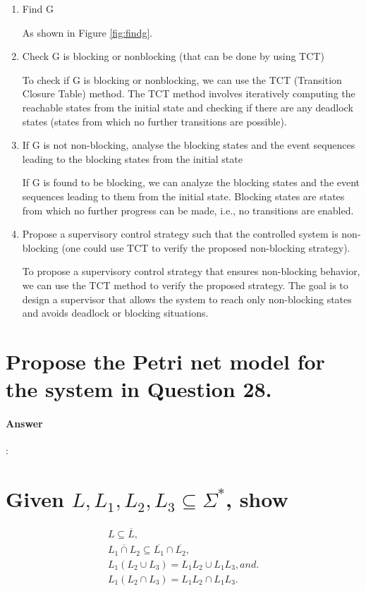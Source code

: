 \documentclass{article}
\begin{document}
\begin{enumerate}
  \item Find G 
  
  As shown in Figure \ref{fig:findg}.
  \item Check G is blocking or nonblocking (that can be done by using TCT)
  
  To check if G is blocking or nonblocking, we can use the TCT (Transition Closure Table) method. The TCT method involves iteratively computing the reachable states from the initial state and checking if there are any deadlock states (states from which no further transitions are possible).
  \item If G is not non-blocking, analyse the blocking states and the event sequences leading to the blocking states from the initial state
  
  If G is found to be blocking, we can analyze the blocking states and the event sequences leading to them from the initial state. Blocking states are states from which no further progress can be made, i.e., no transitions are enabled.
  \item Propose a supervisory control strategy such that the controlled system is non-blocking (one could use TCT to verify the proposed non-blocking strategy).
  
  To propose a supervisory control strategy that ensures non-blocking behavior, we can use the TCT method to verify the proposed strategy. The goal is to design a supervisor that allows the system to reach only non-blocking states and avoids deadlock or blocking situations.
\end{enumerate}

\section{Propose the Petri net model for the system in Question 28.}

\paragraph{Answer}:


\section{Given $L, L_1, L_2, L_3 \subseteq  \Sigma^*$, show}

\begin{gather*}
  L \subseteq \overline{L}, \\
  \overline{ L_1 \cap L_2 } \subseteq \overline{L_1} \cap \overline{L_2}, \\
  L_1(L_2 \cup L_3) = L_1L_2 \cup L_1L_3, and. \\
  L_1(L_2 \cap L_3) = L_1L_2 \cap L_1L_3.
\end{gather*}
\end{document}
